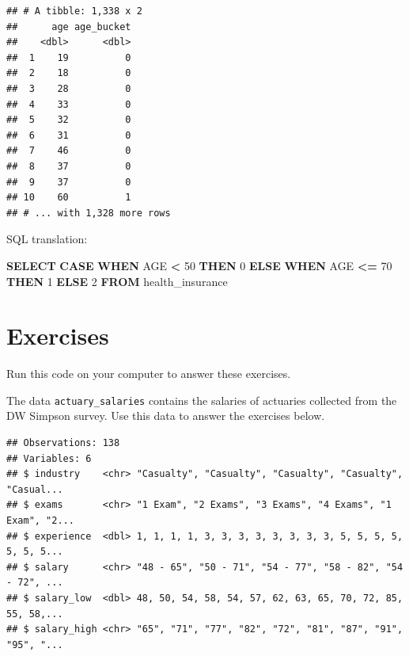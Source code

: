 \documentclass[
  openany]{book}
\newenvironment{Shaded}{\begin{snugshade}}{\end{snugshade}}
\newcommand{\ControlFlowTok}[1]{\textcolor[rgb]{0.13,0.29,0.53}{\textbf{#1}}}
\newcommand{\DecValTok}[1]{\textcolor[rgb]{0.00,0.00,0.81}{#1}}
\newcommand{\KeywordTok}[1]{\textcolor[rgb]{0.13,0.29,0.53}{\textbf{#1}}}
\newcommand{\NormalTok}[1]{#1}
\newcommand{\OperatorTok}[1]{\textcolor[rgb]{0.81,0.36,0.00}{\textbf{#1}}}
\newcommand{\StringTok}[1]{\textcolor[rgb]{0.31,0.60,0.02}{#1}}
\begin{document}
\begin{verbatim}
## # A tibble: 1,338 x 2
##      age age_bucket
##    <dbl>      <dbl>
##  1    19          0
##  2    18          0
##  3    28          0
##  4    33          0
##  5    32          0
##  6    31          0
##  7    46          0
##  8    37          0
##  9    37          0
## 10    60          1
## # ... with 1,328 more rows
\end{verbatim}

SQL translation:

\begin{Shaded}
\begin{Highlighting}[]
\KeywordTok{SELECT} \ControlFlowTok{CASE} \ControlFlowTok{WHEN}\NormalTok{ AGE }\OperatorTok{<} \DecValTok{50} \ControlFlowTok{THEN} \DecValTok{0}
       \ControlFlowTok{ELSE} \ControlFlowTok{WHEN}\NormalTok{ AGE }\OperatorTok{<=} \DecValTok{70} \ControlFlowTok{THEN} \DecValTok{1}
       \ControlFlowTok{ELSE} \DecValTok{2}
\KeywordTok{FROM}\NormalTok{ health_insurance}
\end{Highlighting}
\end{Shaded}

\hypertarget{exercises}{%
\section{Exercises}\label{exercises}}

Run this code on your computer to answer these exercises.

The data \texttt{actuary\_salaries} contains the salaries of actuaries collected from the DW Simpson survey. Use this data to answer the exercises below.

\begin{Shaded}
\end{Shaded}

\begin{verbatim}
## Observations: 138
## Variables: 6
## $ industry    <chr> "Casualty", "Casualty", "Casualty", "Casualty", "Casual...
## $ exams       <chr> "1 Exam", "2 Exams", "3 Exams", "4 Exams", "1 Exam", "2...
## $ experience  <dbl> 1, 1, 1, 1, 3, 3, 3, 3, 3, 3, 3, 3, 5, 5, 5, 5, 5, 5, 5...
## $ salary      <chr> "48 - 65", "50 - 71", "54 - 77", "58 - 82", "54 - 72", ...
## $ salary_low  <dbl> 48, 50, 54, 58, 54, 57, 62, 63, 65, 70, 72, 85, 55, 58,...
## $ salary_high <chr> "65", "71", "77", "82", "72", "81", "87", "91", "95", "...
\end{verbatim}
\end{document}

